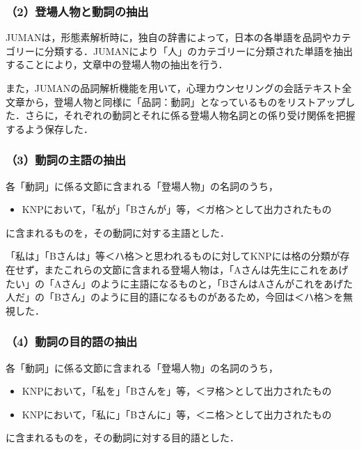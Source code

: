 \documentclass[shuuron]{kuee}
\begin{document}
\subsubsection{（2）登場人物と動詞の抽出}


 JUMANは，形態素解析時に，独自の辞書によって，日本の各単語を品詞やカテゴリーに分類する．JUMANにより「人」のカテゴリーに分類された単語を抽出することにより，文章中の登場人物の抽出を行う．%

また，JUMANの品詞解析機能を用いて，心理カウンセリングの会話テキスト全文章から，登場人物と同様に「品詞：動詞」となっているものをリストアップした．さらに，それぞれの動詞とそれに係る登場人物名詞との係り受け関係を把握するよう保存した．



\subsubsection{（3）動詞の主語の抽出}


各「動詞」に係る文節に含まれる「登場人物」の名詞のうち，
\begin{itemize}
  \item KNPにおいて，「私が」「Bさんが」等，＜ガ格＞として出力されたもの
\end{itemize}
に含まれるものを，その動詞に対する主語とした．

「私は」「Bさんは」等＜ハ格＞と思われるものに対してKNPには格の分類が存在せず，またこれらの文節に含まれる登場人物は，「Aさんは先生にこれをあげたい」の「Aさん」のように主語になるものと，「BさんはAさんがこれをあげた人だ」の「Bさん」のように目的語になるものがあるため，今回は＜ハ格＞を無視した．

\subsubsection{（4）動詞の目的語の抽出}


各「動詞」に係る文節に含まれる「登場人物」の名詞のうち，

\begin{itemize}

  \item KNPにおいて，「私を」「Bさんを」等，＜ヲ格＞として出力されたもの
  \item KNPにおいて，「私に」「Bさんに」等，＜ニ格＞として出力されたもの
\end{itemize}
に含まれるものを，その動詞に対する目的語とした．
\end{document}

